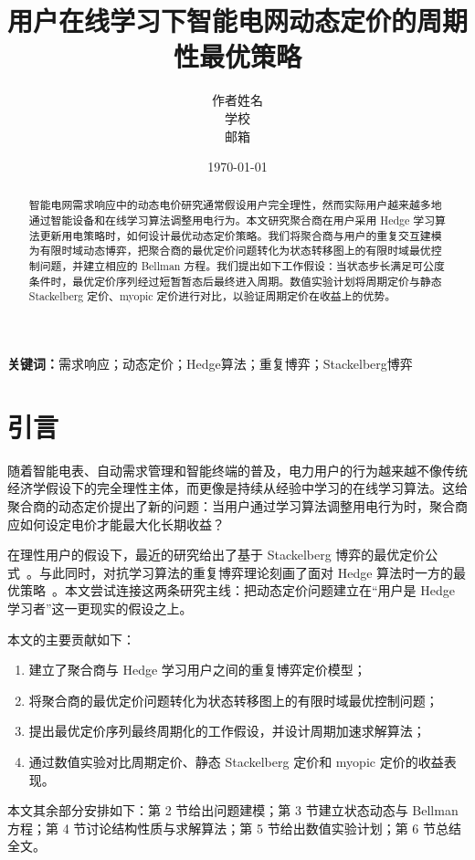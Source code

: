 \documentclass[UTF8]{ctexart}
\title{用户在线学习下智能电网动态定价的周期性最优策略}
\author{作者姓名\\学校\\邮箱}
\date{\today}
\begin{document}
\maketitle

\begin{abstract}
智能电网需求响应中的动态电价研究通常假设用户完全理性，然而实际用户越来越多地通过智能设备和在线学习算法调整用电行为。本文研究聚合商在用户采用 Hedge 学习算法更新用电策略时，如何设计最优动态定价策略。我们将聚合商与用户的重复交互建模为有限时域动态博弈，把聚合商的最优定价问题转化为状态转移图上的有限时域最优控制问题，并建立相应的 Bellman 方程。我们提出如下工作假设：当状态步长满足可公度条件时，最优定价序列经过短暂暂态后最终进入周期。数值实验计划将周期定价与静态 Stackelberg 定价、myopic 定价进行对比，以验证周期定价在收益上的优势。
\end{abstract}

\noindent\textbf{关键词：}需求响应；动态定价；Hedge算法；重复博弈；Stackelberg博弈

\section{引言}

随着智能电表、自动需求管理和智能终端的普及，电力用户的行为越来越不像传统经济学假设下的完全理性主体，而更像是持续从经验中学习的在线学习算法。这给聚合商的动态定价提出了新的问题：当用户通过学习算法调整用电行为时，聚合商应如何设定电价才能最大化长期收益？

在理性用户的假设下，最近的研究给出了基于 Stackelberg 博弈的最优定价公式~\cite{mu2024pricing}。与此同时，对抗学习算法的重复博弈理论刻画了面对 Hedge 算法时一方的最优策略~\cite{guo2023optimal}。本文尝试连接这两条研究主线：把动态定价问题建立在“用户是 Hedge 学习者”这一更现实的假设之上。

本文的主要贡献如下：
\begin{enumerate}
    \item 建立了聚合商与 Hedge 学习用户之间的重复博弈定价模型；
    \item 将聚合商的最优定价问题转化为状态转移图上的有限时域最优控制问题；
    \item 提出最优定价序列最终周期化的工作假设，并设计周期加速求解算法；
    \item 通过数值实验对比周期定价、静态 Stackelberg 定价和 myopic 定价的收益表现。
\end{enumerate}

本文其余部分安排如下：第 2 节给出问题建模；第 3 节建立状态动态与 Bellman 方程；第 4 节讨论结构性质与求解算法；第 5 节给出数值实验计划；第 6 节总结全文。
\end{document}
